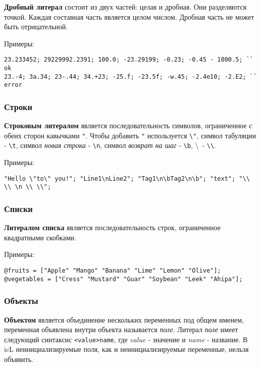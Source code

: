 \documentclass[a4paper, 14pt]{extarticle}
\begin{document}
	{\bf Дробный литерал} состоит из двух частей: целая и дробная. Они разделяются точкой. Каждая составная часть является целом числом. Дробная часть не может быть отрицательной.
	
\noindent Примеры:
\begin{lstlisting}[numbers=none]
23.233452; 29229992.2391; 100.0; -23.29199; -0.23; -0.45 - 1000.5; `` ok
23.-4; 3а.34; 23-.44; 34.+23; -25.f; -23.5f; -w.45; -2.4e10; -2.E2; `` error 
\end{lstlisting}

\subsubsection{Строки}

	{\bf Строковым литералом} является последовательность символов, ограниченное с обеих сторон кавычками \lstinline`"`. Чтобы добавить \lstinline`"` используется \lstinline`\"`, символ табуляции - \lstinline`\t`, символ {\it новая строка} - \lstinline`\n`, символ {\it возврат на шаг} - \lstinline`\b`, \textbackslash \ - \lstinline`\\`.

\noindent Примеры:
\begin{lstlisting}[numbers=none]
"Hello \"to\" you!"; "Line1\nLine2"; "Tag1\n\bTag2\n\b"; "text"; "\\ \\ \n \\ \\";
\end{lstlisting}

\subsubsection{Списки}

	{\bf Литералом списка} является последовательность строк, ограниченное квадратными скобками.

\noindent Примеры:
\begin{lstlisting}[numbers=none]
@fruits = ["Apple" "Mango" "Banana" "Lime" "Lemon" "Olive"];
@vegetables = ["Cress" "Mustard" "Guar" "Soybean" "Leek" "Ahipa"];
\end{lstlisting}

\subsubsection{Объекты}

	{\bf Объектом} является объединение нескольких переменных под общем именем, переменная объявлена внутри объекта называется {\it поле}. Литерал {\it поле} имеет следующий синтаксис \lstinline`<value>name`, где  {\it value} - значение и {\it name} - название. В icL неинициализируемые поля, как и неинициализируемые переменные, нельзя объявить. 
	
\end{document}
